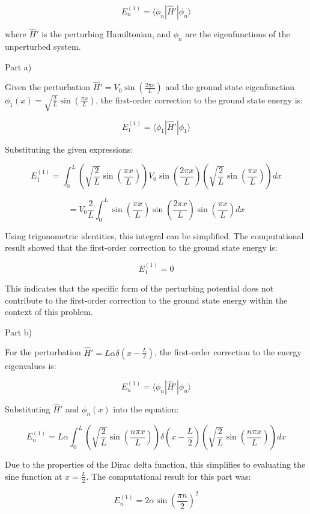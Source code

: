 \[ E_n^{(1)} = \langle \phi_n | \hat{H}' | \phi_n \rangle \]

where \(\hat{H}'\) is the perturbing Hamiltonian, and \(\phi_n\) are the eigenfunctions of the unperturbed system.

Part a)

Given the perturbation \(\hat{H}' = V_0 \sin\left(\frac{2 \pi x}{L} \right)\) and the ground state eigenfunction \(\phi_1(x) = \sqrt{\frac{2}{L}} \sin\left(\frac{\pi x}{L} \right)\), the first-order correction to the ground state energy is:

\[ E_1^{(1)} = \langle \phi_1 | \hat{H}' | \phi_1 \rangle \]

Substituting the given expressions:

\[ E_1^{(1)} = \int_{0}^{L} \left( \sqrt{\frac{2}{L}} \sin\left(\frac{\pi x}{L} \right) \right) V_0 \sin\left(\frac{2 \pi x}{L} \right) \left( \sqrt{\frac{2}{L}} \sin\left(\frac{\pi x}{L} \right) \right) dx \]

\[ = V_0 \frac{2}{L} \int_{0}^{L} \sin\left(\frac{\pi x}{L} \right) \sin\left(\frac{2 \pi x}{L} \right) \sin\left(\frac{\pi x}{L} \right) dx \]

Using trigonometric identities, this integral can be simplified. The computational result showed that the first-order correction to the ground state energy is:

\[ E_1^{(1)} = 0 \]

This indicates that the specific form of the perturbing potential does not contribute to the first-order correction to the ground state energy within the context of this problem.

Part b)

For the perturbation \(\hat{H}' = L\alpha \delta\left(x - \frac{L}{2} \right)\), the first-order correction to the energy eigenvalues is:

\[ E_n^{(1)} = \langle \phi_n | \hat{H}' | \phi_n \rangle \]

Substituting \(\hat{H}'\) and \(\phi_n(x)\) into the equation:

\[ E_n^{(1)} = L\alpha \int_{0}^{L} \left( \sqrt{\frac{2}{L}} \sin\left(\frac{n \pi x}{L} \right) \right) \delta\left(x - \frac{L}{2} \right) \left( \sqrt{\frac{2}{L}} \sin\left(\frac{n \pi x}{L} \right) \right) dx \]

Due to the properties of the Dirac delta function, this simplifies to evaluating the sine function at \(x = \frac{L}{2}\). The computational result for this part was:

\[ E_n^{(1)} = 2\alpha\sin\left(\frac{\pi n}{2}\right)^2 \]

